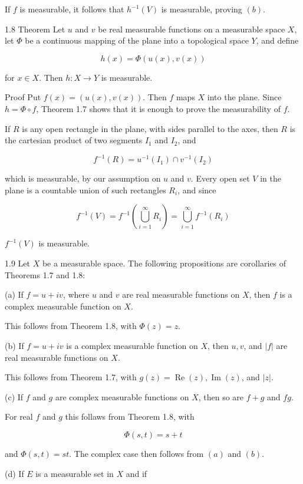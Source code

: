 \documentclass[10pt]{article}
\begin{document}
If $f$ is measurable, it follows that $h^{-1}(V)$ is measurable, proving $(b)$.

1.8 Theorem Let $u$ and $v$ be real measurable functions on a measurable space $X$, let $\Phi$ be a continuous mapping of the plane into a topological space $Y$, and define

$$
h(x)=\Phi(u(x), v(x))
$$

for $x \in X$. Then $h: X \rightarrow Y$ is measurable.

Proof Put $f(x)=(u(x), v(x))$. Then $f$ maps $X$ into the plane. Since $h=\Phi \circ f$, Theorem 1.7 shows that it is enough to prove the measurability of $f$.

If $R$ is any open rectangle in the plane, with sides parallel to the axes, then $R$ is the cartesian product of two segments $I_{1}$ and $I_{2}$, and

$$
f^{-1}(R)=u^{-1}\left(I_{1}\right) \cap v^{-1}\left(I_{2}\right)
$$

which is measurable, by our assumption on $u$ and $v$. Every open set $V$ in the plane is a countable union of such rectangles $R_{i}$, and since

$$
f^{-1}(V)=f^{-1}\left(\bigcup_{i=1}^{\infty} R_{i}\right)=\bigcup_{i=1}^{\infty} f^{-1}\left(R_{i}\right)
$$

$f^{-1}(V)$ is measurable.

1.9 Let $X$ be a measurable space. The following propositions are corollaries of Theorems 1.7 and 1.8:

(a) If $f=u+i v$, where $u$ and $v$ are real measurable functions on $X$, then $f$ is a complex measurable function on $X$.

This follows from Theorem 1.8, with $\Phi(z)=z$.

(b) If $f=u+i v$ is a complex measurable function on $X$, then $u, v$, and $|f|$ are real measurable functions on $X$.

This follows from Theorem 1.7, with $g(z)=\operatorname{Re}(z), \operatorname{Im}(z)$, and $|z|$.

(c) If $f$ and $g$ are complex measurable functions on $X$, then so are $f+g$ and $f g$.

For real $f$ and $g$ this follaws from Theorem 1.8, with

$$
\Phi(s, t)=s+t
$$

and $\Phi(s, t)=s t$. The complex case then follows from $(a)$ and $(b)$.

(d) If $E$ is a measurable set in $X$ and if
\end{document}
